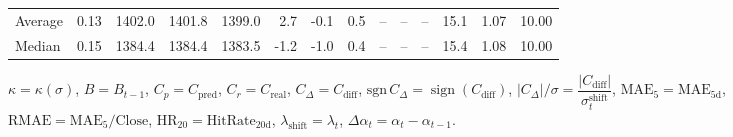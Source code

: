 \begin{threeparttable}
{\begin{tabular}{lrrrrrrrrrrrrr}
Average &     0.13 & 1402.0 & 1401.8 & 1399.0 &        2.7 &                     -0.1 &                 0.5 &         -- &        -- &             -- &             15.1 &            1.07 &                  10.00 \\
 Median &     0.15 & 1384.4 & 1384.4 & 1383.5 &       -1.2 &                     -1.0 &                 0.4 &         -- &        -- &             -- &             15.4 &            1.08 &                  10.00 \\
\bottomrule
\end{tabular}
}
\begin{tablenotes}\footnotesize
\item $\kappa=\kappa(\sigma)$, $B=B_{t-1}$, $C_p=C_{\text{pred}}$, $C_r=C_{\text{real}}$, $C_\Delta=C_{\text{diff}}$, $\mathrm{sgn}\,C_\Delta=\operatorname{sign}(C_{\text{diff}})$, $|C_\Delta|/\sigma=\dfrac{|C_{\text{diff}}|}{\sigma_t^{\text{shift}}}$, $\mathrm{MAE}_5=\mathrm{MAE}_{5\text{d}}$, $\mathrm{RMAE}= \mathrm{MAE}_5 / \text{Close}$, $\mathrm{HR}_{20}=\mathrm{HitRate}_{20\text{d}}$, 
$\lambda_{\text{shift}}=\lambda_t$, 
$\Delta\alpha_t=\alpha_t-\alpha_{t-1}$.
\end{tablenotes}
\end{threeparttable}
\endgroup

